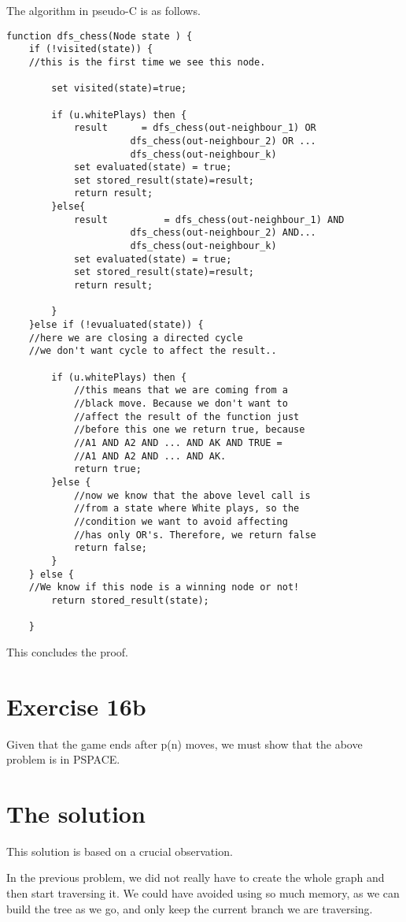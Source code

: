 The algorithm in pseudo-C is as follows. 

\clearpage
\lstset{language=C 
	}
\begin{lstlisting}
function dfs_chess(Node state ) {
	if (!visited(state)) {
	//this is the first time we see this node.

		set visited(state)=true;

		if (u.whitePlays) then { 
			result		= dfs_chess(out-neighbour_1) OR 
					  dfs_chess(out-neighbour_2) OR ...
					  dfs_chess(out-neighbour_k) 
			set evaluated(state) = true;
			set stored_result(state)=result;
			return result;
		}else{ 
			result          = dfs_chess(out-neighbour_1) AND
					  dfs_chess(out-neighbour_2) AND...
					  dfs_chess(out-neighbour_k)
			set evaluated(state) = true;
			set stored_result(state)=result;
			return result;

		}
	}else if (!evualuated(state)) { 
	//here we are closing a directed cycle
	//we don't want cycle to affect the result..
					
		if (u.whitePlays) then { 
			//this means that we are coming from a 
			//black move. Because we don't want to 
			//affect the result of the function just 
			//before this one we return true, because
			//A1 AND A2 AND ... AND AK AND TRUE = 
			//A1 AND A2 AND ... AND AK.
			return true;
		}else {
			//now we know that the above level call is 
			//from a state where White plays, so the 
			//condition we want to avoid affecting 
			//has only OR's. Therefore, we return false
			return false; 
		}		
	} else { 
	//We know if this node is a winning node or not!	
		return stored_result(state);

	}
\end{lstlisting}

 
This concludes the proof.

\section*{Exercise 16b}

Given that the game ends after p(n) moves, we must show that the above problem
is in PSPACE.

\section*{The solution}

This solution is based on a crucial observation. 

In the previous problem, we did not really have to create the whole
graph and then start traversing it. We could have avoided using so much memory,
as we can build the tree as we go, and only keep the current branch we are
traversing. 

